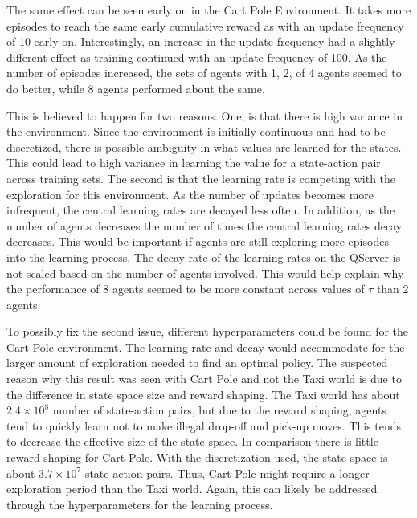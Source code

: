 \documentclass[jair,twoside,11pt,theapa]{article}
\begin{document}
The same effect can be seen early on in the Cart Pole Environment. It takes more episodes to reach the same early cumulative reward as with an update frequency of 10 early on. Interestingly, an increase in the update frequency had a slightly different effect as training continued with an update frequency of 100. As the number of episodes increased, the sets of agents with 1, 2, of 4 agents seemed to do better, while 8 agents performed about the same. 

This is believed to happen for two reasons. One, is that there is high variance in the environment. Since the environment is initially continuous and had to be discretized, there is possible ambiguity in what values are learned for the states. This could lead to high variance in learning the value for a state-action pair across training sets. The second is that the learning rate is competing with the exploration for this environment. As the number of updates becomes more infrequent, the central learning rates are decayed less often. In addition, as the number of agents decreases the number of times the central learning rates decay decreases. This would be important if agents are still exploring more episodes into the learning process. The decay rate of the learning rates on the QServer is not scaled based on the number of agents involved. This would help explain why the performance of 8 agents seemed to be more constant across values of $\tau$ than 2 agents.

To possibly fix the second issue, different hyperparameters could be found for the Cart Pole environment. The learning rate and decay would accommodate for the larger amount of exploration needed to find an optimal policy. The suspected reason why this result was seen with Cart Pole and not the Taxi world is due to the difference in state space size and reward shaping. The Taxi world has about  $2.4 \times 10^8$ number of state-action pairs, but due to the reward shaping, agents tend to quickly learn not to make illegal drop-off and pick-up moves. This tends to decrease the effective size of the state space. In comparison there is little reward shaping for Cart Pole. With the discretization used, the state space is about  $3.7 \times 10^7$ state-action pairs. Thus, Cart Pole might require a longer exploration period than the Taxi world. Again, this can likely be addressed through the hyperparameters for the learning process. 


\iffalse
\end{document}
